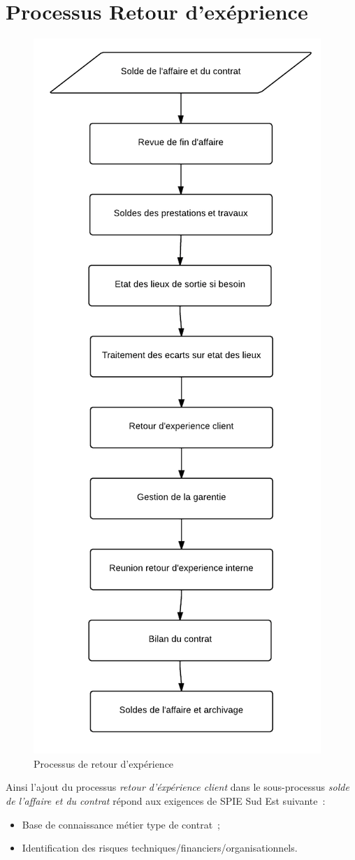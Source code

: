 \section{Processus Retour d'exéprience}

\begin{figure}[h!]
	\centering
	\includegraphics[width=0.45\linewidth]{images/processus_retour_experience.png}
	\caption{Processus de retour d’expérience}
	\label{fig:processusRetourExperience}
\end{figure}

Ainsi l'ajout du processus \textit{retour d'\'exp\'erience client} dans le sous-processus \textit{solde
de l'affaire et du contrat} r\'epond aux exigences de SPIE Sud Est suivante~:

\begin{itemize}
    \item Base de connaissance m\'etier type de contrat~;
    \item Identification des risques techniques/financiers/organisationnels.
\end{itemize}

